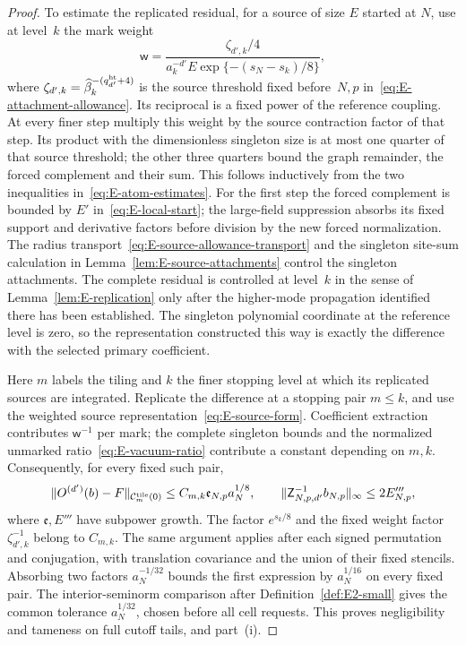 \begin{proof}
To estimate the replicated residual, for a source of size $E$ started at $N$, use at level~$k$ the mark weight
\begin{equation*}
 \mathsf w=\frac{\zeta_{d',k}/4}{a_k^{-d'}E\exp\{-(s_N-s_k)/8\}},
\end{equation*}
where $\zeta_{d',k}=\widehat\beta_k^{-(q^{\rm ht}_{d'}+4)}$ is the source threshold fixed before~$N,p$ in~\eqref{eq:E-attachment-allowance}. Its reciprocal is a fixed power of the reference coupling. At every finer step multiply this weight by the source contraction factor of that step. Its product with the dimensionless singleton size is at most one quarter of that source threshold; the other three quarters bound the graph remainder, the forced complement and their sum. This follows inductively from the two inequalities in~\eqref{eq:E-atom-estimates}. For the first step the forced complement is bounded by $E'$ in~\eqref{eq:E-local-start}; the large-field suppression absorbs its fixed support and derivative factors before division by the new forced normalization. The radius transport~\eqref{eq:E-source-allowance-transport} and the singleton site-sum calculation in Lemma~\ref{lem:E-source-attachments} control the singleton attachments. The complete residual is controlled at level~$k$ in the sense of Lemma~\ref{lem:E-replication} only after the higher-mode propagation identified there has been established. The singleton polynomial coordinate at the reference level is zero, so the representation constructed this way is exactly the difference with the selected primary coefficient.

Here $m$ labels the tiling and $k$ the finer stopping level at which its replicated sources are integrated. Replicate the difference at a stopping pair $m\le k$, and use the weighted source representation~\eqref{eq:E-source-form}. Coefficient extraction contributes $\mathsf w^{-1}$ per mark; the complete singleton bounds and the normalized unmarked ratio~\eqref{eq:E-vacuum-ratio} contribute a constant depending on $m,k$. Consequently, for every fixed such pair,
\begin{equation}\label{eq:E-local-error}
 \|O^{(d')}(b)-F\|_{\mathcal C^{\rm tile}_m(0)}
 \le C_{m,k}\mathfrak e_{N,p}a_N^{1/8},\qquad
 \|\mathsf Z_{N,p,d'}^{-1}b_{N,p}\|_\infty\le2E'''_{N,p},
\end{equation}
where $\mathfrak e,E'''$ have subpower growth. The factor $e^{s_k/8}$ and the fixed weight factor $\zeta_{d',k}^{-1}$ belong to $C_{m,k}$. The same argument applies after each signed permutation and conjugation, with translation covariance and the union of their fixed stencils. Absorbing two factors $a_N^{-1/32}$ bounds the first expression by $a_N^{1/16}$ on every fixed pair. The interior-seminorm comparison after Definition~\ref{def:E2-small} gives the common tolerance $a_N^{1/32}$, chosen before all cell requests. This proves negligibility and tameness on full cutoff tails, and part~(i).


\end{proof}
